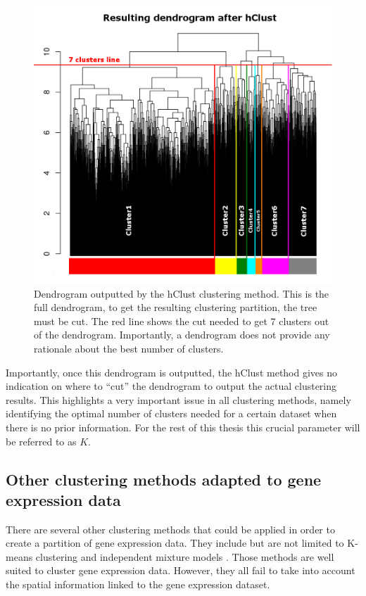 	\begin{figure}[h]
\centerline{\includegraphics[width=\linewidth]{gfx/chapter3/dendro.png}}
\caption{Dendrogram outputted by the hClust clustering method. This is the full dendrogram, to get the resulting clustering partition, the tree must be cut. The red line shows the cut needed to get 7 clusters out of the dendrogram. Importantly, a dendrogram does not provide any rationale about the best number of clusters.}\label{fig:dendro}
	\end{figure}	
	
	Importantly, once this dendrogram is outputted, the hClust method gives no indication on where to ``cut'' the dendrogram to output the actual clustering results. This highlights a very important issue in all clustering methods, namely identifying the optimal number of clusters needed for a certain dataset when there is no prior information. For the rest of this thesis this crucial parameter will be referred to as $K$.\\

 
	\subsection{Other clustering methods adapted to gene expression data}
	There are several other clustering methods that could be applied in order to create a partition of gene expression data. They include but are not limited to K-means clustering \cite{macqueen67} and independent mixture models \cite{dempster77}. Those methods are well suited to cluster gene expression data. However, they all fail to take into account the spatial information linked to the gene expression dataset.


